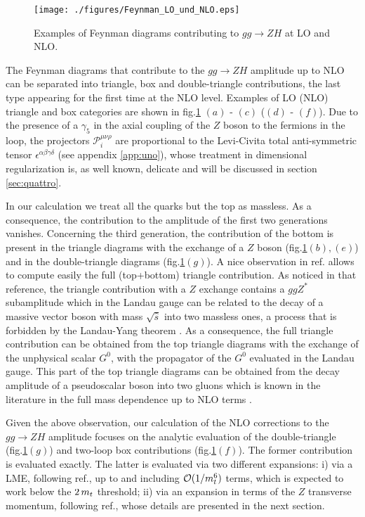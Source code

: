 \begin{figure}
	\begin{center}
		\texttt{[image: ./figures/Feynman\_LO\_und\_NLO.eps]}
		\caption{Examples of Feynman diagrams contributing to $gg \to ZH$ at  LO and
			NLO.}
		\label{fig:dia}
	\end{center}
\end{figure}

The Feynman diagrams that contribute to the $gg \to  ZH$ amplitude up to NLO
can be separated into triangle, box and double-triangle
contributions, the last type appearing for the first time at the
NLO level. Examples of LO (NLO) triangle and box
categories are shown in fig.\ref{fig:dia} $(a)$ - $(c)$
($(d)$ - $(f)$).
Due to the presence of a $\gamma_5$ in the axial coupling of the $Z$ boson to
the fermions in the loop, the projectors $\mathcal{P}_i^{\mu\nu\rho}$ are
proportional to the Levi-Civita total anti-symmetric tensor
$\epsilon^{\alpha\beta\gamma\delta}$ (see appendix \ref{app:uno}),
whose treatment in dimensional regularization is, as well known, delicate
and will be discussed in section \ref{sec:quattro}.

In our calculation we treat all the quarks but the top as massless.
As a consequence, the contribution to the amplitude of the first two generations
vanishes. Concerning the third generation, the contribution of the bottom
is present  in the triangle diagrams with the exchange of a $Z$ boson
(fig.\ref{fig:dia}$(b),(e)$) and in the double-triangle diagrams
(fig.\ref{fig:dia}$(g)$).
A nice observation in ref.\cite{Altenkamp:2012sx} allows to compute
easily the full (top+bottom) triangle contribution. As noticed in that
reference,
the triangle contribution with a $Z$ exchange contains a $ggZ^*$ subamplitude
which in the Landau gauge can be related to the decay of a massive vector boson
with mass $\sqrt{\hat{s}}$ into two massless ones, a process that is
forbidden by
the Landau-Yang theorem \cite{Landau:1948kw,Yang:1950rg}. As a consequence,
the full triangle contribution can be obtained from the top triangle diagrams
with the exchange of the unphysical scalar $G^0$, with the propagator of the
$G^0$ evaluated in the Landau gauge. This part of the top triangle
diagrams  can be obtained from the decay
amplitude of a pseudoscalar boson into two gluons which is  known in
the literature in the full mass dependence up to NLO terms \cite{Spira:1995rr,Aglietti:2006tp}. 

Given the above observation, our calculation of the NLO corrections to
the $gg \to ZH$ amplitude focuses on the analytic evaluation of the
double-triangle (fig.\ref{fig:dia}$(g)$) and two-loop box contributions
(fig.\ref{fig:dia}$(f)$). The former contribution is evaluated exactly.
The latter is evaluated via two different expansions: i) via  a LME, following
ref.\cite{Degrassi:2010eu}, up to and including ${\cal O}(1/m_t^6)$ terms,
which is expected to work below the $2\, m_t$ threshold; ii) via an expansion in
terms of the $Z$ transverse momentum, following ref.\cite{Bonciani:2018omm},
whose details are presented in the next section.

